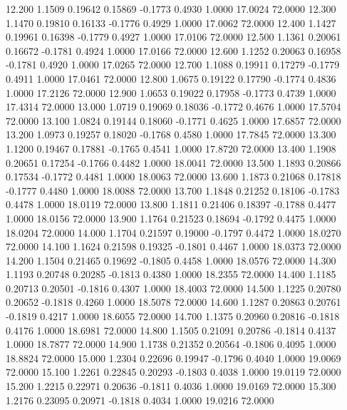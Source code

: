   12.200   1.1509   0.19642   0.15869  -0.1773   0.4930   1.0000  17.0024  72.0000
  12.300   1.1470   0.19810   0.16133  -0.1776   0.4929   1.0000  17.0062  72.0000
  12.400   1.1427   0.19961   0.16398  -0.1779   0.4927   1.0000  17.0106  72.0000
  12.500   1.1361   0.20061   0.16672  -0.1781   0.4924   1.0000  17.0166  72.0000
  12.600   1.1252   0.20063   0.16958  -0.1781   0.4920   1.0000  17.0265  72.0000
  12.700   1.1088   0.19911   0.17279  -0.1779   0.4911   1.0000  17.0461  72.0000
  12.800   1.0675   0.19122   0.17790  -0.1774   0.4836   1.0000  17.2126  72.0000
  12.900   1.0653   0.19022   0.17958  -0.1773   0.4739   1.0000  17.4314  72.0000
  13.000   1.0719   0.19069   0.18036  -0.1772   0.4676   1.0000  17.5704  72.0000
  13.100   1.0824   0.19144   0.18060  -0.1771   0.4625   1.0000  17.6857  72.0000
  13.200   1.0973   0.19257   0.18020  -0.1768   0.4580   1.0000  17.7845  72.0000
  13.300   1.1200   0.19467   0.17881  -0.1765   0.4541   1.0000  17.8720  72.0000
  13.400   1.1908   0.20651   0.17254  -0.1766   0.4482   1.0000  18.0041  72.0000
  13.500   1.1893   0.20866   0.17534  -0.1772   0.4481   1.0000  18.0063  72.0000
  13.600   1.1873   0.21068   0.17818  -0.1777   0.4480   1.0000  18.0088  72.0000
  13.700   1.1848   0.21252   0.18106  -0.1783   0.4478   1.0000  18.0119  72.0000
  13.800   1.1811   0.21406   0.18397  -0.1788   0.4477   1.0000  18.0156  72.0000
  13.900   1.1764   0.21523   0.18694  -0.1792   0.4475   1.0000  18.0204  72.0000
  14.000   1.1704   0.21597   0.19000  -0.1797   0.4472   1.0000  18.0270  72.0000
  14.100   1.1624   0.21598   0.19325  -0.1801   0.4467   1.0000  18.0373  72.0000
  14.200   1.1504   0.21465   0.19692  -0.1805   0.4458   1.0000  18.0576  72.0000
  14.300   1.1193   0.20748   0.20285  -0.1813   0.4380   1.0000  18.2355  72.0000
  14.400   1.1185   0.20713   0.20501  -0.1816   0.4307   1.0000  18.4003  72.0000
  14.500   1.1225   0.20780   0.20652  -0.1818   0.4260   1.0000  18.5078  72.0000
  14.600   1.1287   0.20863   0.20761  -0.1819   0.4217   1.0000  18.6055  72.0000
  14.700   1.1375   0.20960   0.20816  -0.1818   0.4176   1.0000  18.6981  72.0000
  14.800   1.1505   0.21091   0.20786  -0.1814   0.4137   1.0000  18.7877  72.0000
  14.900   1.1738   0.21352   0.20564  -0.1806   0.4095   1.0000  18.8824  72.0000
  15.000   1.2304   0.22696   0.19947  -0.1796   0.4040   1.0000  19.0069  72.0000
  15.100   1.2261   0.22845   0.20293  -0.1803   0.4038   1.0000  19.0119  72.0000
  15.200   1.2215   0.22971   0.20636  -0.1811   0.4036   1.0000  19.0169  72.0000
  15.300   1.2176   0.23095   0.20971  -0.1818   0.4034   1.0000  19.0216  72.0000
